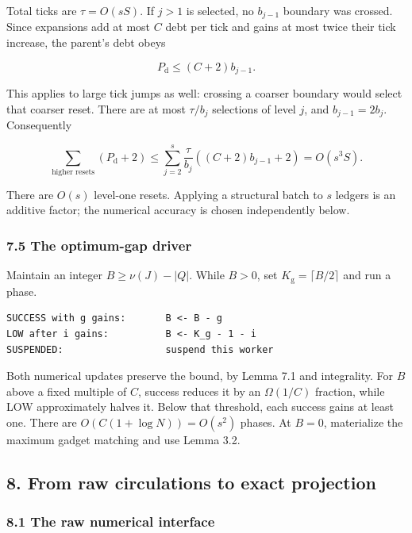Total ticks are \(\tau=O(sS)\). If \(j>1\) is selected, no \(b_{j-1}\) boundary was crossed. Since expansions add at most \(C\) debt per tick and gains at most twice their tick increase, the parent's debt obeys

\[
P_{\mathrm d}\leq(C+2)b_{j-1}.
 \tag{17}
\]

This applies to large tick jumps as well: crossing a coarser boundary would select that coarser reset. There are at most \(\tau/b_j\) selections of level \(j\), and \(b_{j-1}=2b_j\). Consequently

\[
\sum_{\text{higher resets}}(P_{\mathrm d}+2)
 \leq\sum_{j=2}^{s}\frac{\tau}{b_j}
                         ((C+2)b_{j-1}+2)
 =O(s^3S).
 \tag{18}
\]

There are \(O(s)\) level-one resets. Applying a structural batch to \(s\) ledgers is an additive factor; the numerical accuracy is chosen independently below.

\hypertarget{af-46593eb93e-the-optimum-gap-driver}{%
\subsubsection{7.5 The optimum-gap driver}\label{af-46593eb93e-the-optimum-gap-driver}}

Maintain an integer \(B\geq\nu(J)-|Q|\). While \(B>0\), set \(K_{\mathrm g}=\lceil B/2\rceil\) and run a phase.

\begin{verbatim}
SUCCESS with g gains:       B <- B - g
LOW after i gains:          B <- K_g - 1 - i
SUSPENDED:                  suspend this worker
\end{verbatim}

Both numerical updates preserve the bound, by Lemma 7.1 and integrality. For \(B\) above a fixed multiple of \(C\), success reduces it by an \(\Omega(1/C)\) fraction, while LOW approximately halves it. Below that threshold, each success gains at least one. There are \(O(C(1+\log N))=O(s^2)\) phases. At \(B=0\), materialize the maximum gadget matching and use Lemma 3.2.

\hypertarget{af-46593eb93e-from-raw-circulations-to-exact-projection}{%
\subsection{8. From raw circulations to exact projection}\label{af-46593eb93e-from-raw-circulations-to-exact-projection}}

\hypertarget{af-46593eb93e-the-raw-numerical-interface}{%
\subsubsection{8.1 The raw numerical interface}\label{af-46593eb93e-the-raw-numerical-interface}}


